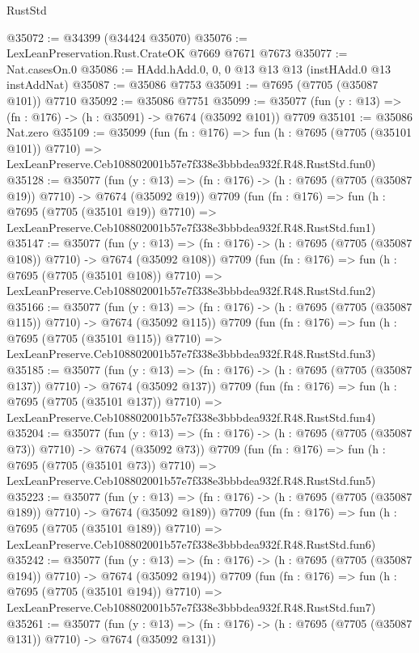 \begin{lexlean}{RustStd}
\begin{coremodule}
@35072 := @34399 (@34424 @35070)
@35076 := LexLeanPreservation.Rust.CrateOK @7669 @7671 @7673
@35077 := Nat.casesOn.{0}
@35086 := HAdd.hAdd.{0, 0, 0} @13 @13 @13 (instHAdd.{0} @13 instAddNat)
@35087 := @35086 @7753
@35091 := @7695 (@7705 (@35087 @101)) @7710
@35092 := @35086 @7751
@35099 := @35077 (fun (y : @13) => (fn : @176) -> (h : @35091) -> @7674 (@35092 @101)) @7709
@35101 := @35086 Nat.zero
@35109 := @35099
    (fun (fn : @176) =>
    fun (h : @7695 (@7705 (@35101 @101)) @7710) =>
    LexLeanPreserve.Ceb108802001b57e7f338e3bbbdea932f.R48.RustStd.fun0)
@35128 := @35077
    (fun (y : @13) => (fn : @176) -> (h : @7695 (@7705 (@35087 @19)) @7710) -> @7674 (@35092 @19))
    @7709
    (fun (fn : @176) =>
    fun (h : @7695 (@7705 (@35101 @19)) @7710) =>
    LexLeanPreserve.Ceb108802001b57e7f338e3bbbdea932f.R48.RustStd.fun1)
@35147 := @35077
    (fun (y : @13) => (fn : @176) -> (h : @7695 (@7705 (@35087 @108)) @7710) -> @7674 (@35092 @108))
    @7709
    (fun (fn : @176) =>
    fun (h : @7695 (@7705 (@35101 @108)) @7710) =>
    LexLeanPreserve.Ceb108802001b57e7f338e3bbbdea932f.R48.RustStd.fun2)
@35166 := @35077
    (fun (y : @13) => (fn : @176) -> (h : @7695 (@7705 (@35087 @115)) @7710) -> @7674 (@35092 @115))
    @7709
    (fun (fn : @176) =>
    fun (h : @7695 (@7705 (@35101 @115)) @7710) =>
    LexLeanPreserve.Ceb108802001b57e7f338e3bbbdea932f.R48.RustStd.fun3)
@35185 := @35077
    (fun (y : @13) => (fn : @176) -> (h : @7695 (@7705 (@35087 @137)) @7710) -> @7674 (@35092 @137))
    @7709
    (fun (fn : @176) =>
    fun (h : @7695 (@7705 (@35101 @137)) @7710) =>
    LexLeanPreserve.Ceb108802001b57e7f338e3bbbdea932f.R48.RustStd.fun4)
@35204 := @35077
    (fun (y : @13) => (fn : @176) -> (h : @7695 (@7705 (@35087 @73)) @7710) -> @7674 (@35092 @73))
    @7709
    (fun (fn : @176) =>
    fun (h : @7695 (@7705 (@35101 @73)) @7710) =>
    LexLeanPreserve.Ceb108802001b57e7f338e3bbbdea932f.R48.RustStd.fun5)
@35223 := @35077
    (fun (y : @13) => (fn : @176) -> (h : @7695 (@7705 (@35087 @189)) @7710) -> @7674 (@35092 @189))
    @7709
    (fun (fn : @176) =>
    fun (h : @7695 (@7705 (@35101 @189)) @7710) =>
    LexLeanPreserve.Ceb108802001b57e7f338e3bbbdea932f.R48.RustStd.fun6)
@35242 := @35077
    (fun (y : @13) => (fn : @176) -> (h : @7695 (@7705 (@35087 @194)) @7710) -> @7674 (@35092 @194))
    @7709
    (fun (fn : @176) =>
    fun (h : @7695 (@7705 (@35101 @194)) @7710) =>
    LexLeanPreserve.Ceb108802001b57e7f338e3bbbdea932f.R48.RustStd.fun7)
@35261 := @35077
    (fun (y : @13) => (fn : @176) -> (h : @7695 (@7705 (@35087 @131)) @7710) -> @7674 (@35092 @131))

\end{coremodule}
\end{lexlean}
